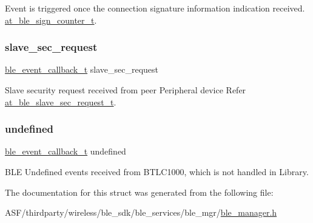 Event is triggered once the connection signature information indication received. \mbox{\hyperlink{structat__ble__sign__counter__t}{at\+\_\+ble\+\_\+sign\+\_\+counter\+\_\+t}}. 

\mbox{\label{structble__gap__event__cb_a13f404377a9ffdd95fc8903626dbf4a2}} 
\subsubsection{\texorpdfstring{slave\_sec\_request}{slave\_sec\_request}}
{\footnotesize\ttfamily \mbox{\hyperlink{ble__manager_8h_a04ce4bb8cb8282f2762e3924b1773cc9}{ble\+\_\+event\+\_\+callback\+\_\+t}} slave\+\_\+sec\+\_\+request}



Slave security request received from peer Peripheral device Refer \mbox{\hyperlink{structat__ble__slave__sec__request__t}{at\+\_\+ble\+\_\+slave\+\_\+sec\+\_\+request\+\_\+t}}. 

\mbox{\label{structble__gap__event__cb_a7d48511f1be9edaa2c90203676a4783d}} 
\subsubsection{\texorpdfstring{undefined}{undefined}}
{\footnotesize\ttfamily \mbox{\hyperlink{ble__manager_8h_a04ce4bb8cb8282f2762e3924b1773cc9}{ble\+\_\+event\+\_\+callback\+\_\+t}} undefined}



B\+LE Undefined events received from B\+T\+L\+C1000, which is not handled in Library. 



The documentation for this struct was generated from the following file\+:\begin{DoxyCompactItemize}
\item 
A\+S\+F/thirdparty/wireless/ble\+\_\+sdk/ble\+\_\+services/ble\+\_\+mgr/\mbox{\hyperlink{ble__manager_8h}{ble\+\_\+manager.\+h}}\end{DoxyCompactItemize}
